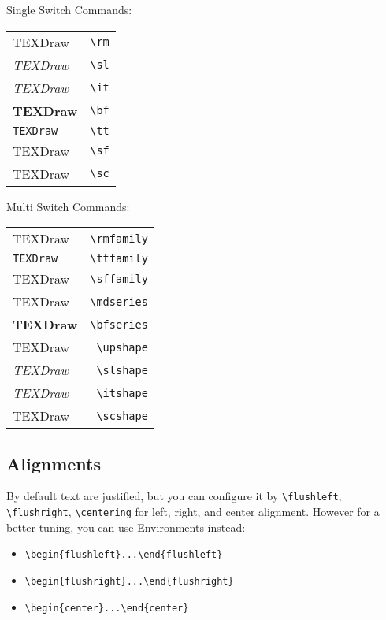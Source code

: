 	\begin{center}
		Single Switch Commands:

		\begin{tabular}{l r}
			{\rm TEXDraw} & \verb|\rm| \\
			{\sl TEXDraw} & \verb|\sl| \\
			{\it TEXDraw} & \verb|\it| \\
			{\bf TEXDraw} & \verb|\bf| \\
			{\tt TEXDraw} & \verb|\tt| \\
			{\sf TEXDraw} & \verb|\sf| \\
			{\sc TEXDraw} & \verb|\sc| \\
		\end{tabular}

	Multi Switch Commands:

		\begin{tabular}{l r}
		{\rm TEXDraw} & \verb|\rmfamily| \\
		{\tt TEXDraw} & \verb|\ttfamily| \\
		{\sf TEXDraw} & \verb|\sffamily| \\
		\hline
		{\rm TEXDraw} & \verb|\mdseries| \\
		{\bf TEXDraw} & \verb|\bfseries| \\
		\hline
		{\rm TEXDraw} & \verb|\upshape| \\
		{\sl TEXDraw} & \verb|\slshape| \\
		{\it TEXDraw} & \verb|\itshape| \\
		{\sc TEXDraw} & \verb|\scshape| \\
		\end{tabular}
	\end{center}

	\subsection{Alignments}

	By default text are justified, but you can configure it by \verb|\flushleft|, \verb|\flushright|, \verb|\centering| for left, right, and center alignment. However for a better tuning, you can use Environments instead:

	\begin{itemize}
		\item \verb|\begin{flushleft}...\end{flushleft}|
		\item \verb|\begin{flushright}...\end{flushright}|
		\item \verb|\begin{center}...\end{center}|
	\end{itemize}

